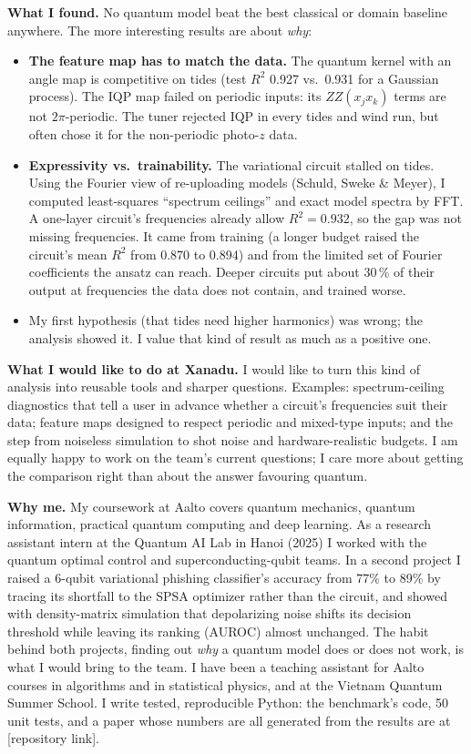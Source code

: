 \documentclass[11pt,a4paper]{article}
\newcommand{\fillin}[1]{\textcolor{orange!80!black}{[#1]}}
\begin{document}
\textbf{What I found.} No quantum model beat the best classical or domain baseline anywhere.
The more interesting results are about \emph{why}:
\begin{itemize}\setlength{\itemsep}{0pt}\setlength{\topsep}{2pt}
  \item \textbf{The feature map has to match the data.} The quantum kernel with an angle map is
        competitive on tides (test $R^2$ 0.927 vs.\ 0.931 for a Gaussian process). The IQP map
        failed on periodic inputs: its $ZZ(x_jx_k)$ terms are not $2\pi$-periodic. The tuner
        rejected IQP in every tides and wind run, but often chose it for the non-periodic photo-$z$ data.
  \item \textbf{Expressivity vs.\ trainability.} The variational circuit stalled on tides. Using
        the Fourier view of re-uploading models (Schuld, Sweke \& Meyer), I computed
        least-squares ``spectrum ceilings'' and exact model spectra by FFT. A one-layer
        circuit's frequencies already allow $R^2 = 0.932$, so the gap was not missing
        frequencies. It came from training (a longer budget raised the circuit's mean $R^2$ from 0.870
        to 0.894) and from the limited set of Fourier coefficients the ansatz can reach. Deeper circuits put about 30\,\% of their output at frequencies the
        data does not contain, and trained worse.
  \item My first hypothesis (that tides need higher harmonics) was wrong; the analysis
        showed it. I value that kind of result as much as a positive one.
\end{itemize}

\textbf{What I would like to do at Xanadu.} I would like to turn this kind of analysis into
reusable tools and sharper questions. Examples: spectrum-ceiling diagnostics that tell a user
in advance whether a circuit's frequencies suit their data; feature maps designed to respect
periodic and mixed-type inputs; and the step from noiseless simulation to shot noise and
hardware-realistic budgets. I am equally happy to work on the team's current questions; I care
more about getting the comparison right than about the answer favouring quantum.

\textbf{Why me.} My coursework at Aalto covers quantum mechanics, quantum information, practical
quantum computing and deep learning. As a research assistant intern at the Quantum AI Lab in Hanoi (2025) I worked with the
quantum optimal control and superconducting-qubit teams. In a second project I raised a 6-qubit
variational phishing classifier's accuracy from 77\% to 89\% by tracing its shortfall to the SPSA
optimizer rather than the circuit, and showed with density-matrix simulation that depolarizing
noise shifts its decision threshold while leaving its ranking (AUROC) almost unchanged. The habit
behind both projects, finding out \emph{why} a quantum model does or does not work, is what I
would bring to the team. I have been a teaching assistant for Aalto courses in algorithms and in
statistical physics, and at the Vietnam Quantum Summer School. I write tested, reproducible
Python: the benchmark's code, 50 unit tests, and a paper whose numbers are all generated from the
results are at \fillin{repository link}.
\end{document}
